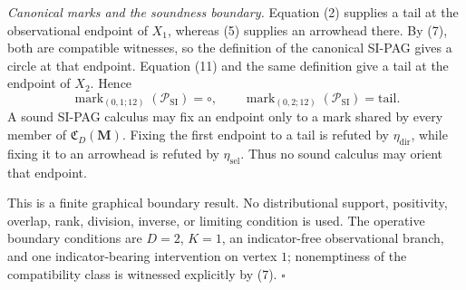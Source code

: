 \emph{Canonical marks and the soundness boundary.}
Equation (2) supplies a tail at the observational endpoint of \(X_1\), whereas
(5) supplies an arrowhead there.  By (7), both are compatible witnesses, so the
definition of the canonical SI-PAG gives a circle at that endpoint.  Equation (11)
and the same definition give a tail at the endpoint of \(X_2\).  Hence
\[
 \operatorname{mark}_{(0,1;12)}(\mathcal P_{\mathrm{SI}})=\circ,
 \qquad
 \operatorname{mark}_{(0,2;12)}(\mathcal P_{\mathrm{SI}})=\mathrm{tail}.
 \tag{12}
\]
A sound SI-PAG calculus may fix an endpoint only to a mark shared by every member
of \(\mathfrak C_D(\mathbf M)\).  Fixing the first endpoint to a tail is refuted by
\(\eta_{\mathrm{dir}}\), while fixing it to an arrowhead is refuted by
\(\eta_{\mathrm{sel}}\).  Thus no sound calculus may orient that endpoint.

This is a finite graphical boundary result.  No distributional support, positivity,
overlap, rank, division, inverse, or limiting condition is used.  The operative boundary
conditions are \(D=2\), \(K=1\), an indicator-free observational branch, and one
indicator-bearing intervention on vertex \(1\); nonemptiness of the compatibility class
is witnessed explicitly by (7).  \(\square\)